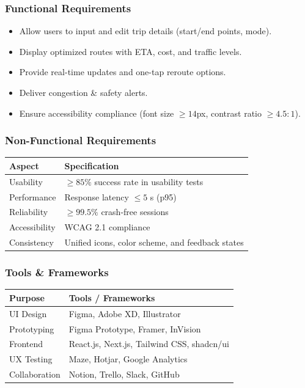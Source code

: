 \subsubsection{Functional Requirements}
\begin{itemize}
  \item Allow users to input and edit trip details (start/end points, mode).
  \item Display optimized routes with ETA, cost, and traffic levels.
  \item Provide real-time updates and one-tap reroute options.
  \item Deliver congestion \& safety alerts.
  \item Ensure accessibility compliance (font size $\ge 14$px, contrast ratio $\ge 4.5:1$).
\end{itemize}

\subsubsection{Non-Functional Requirements}
\renewcommand{\arraystretch}{1.12}
\begin{tabularx}{\textwidth}{|>{\raggedright\arraybackslash}p{2.9cm}|>{\raggedright\arraybackslash}X|}
\hline
	\textbf{Aspect} & \textbf{Specification} \\
\hline
Usability & $\ge 85\%$ success rate in usability tests \\
\hline
Performance & Response latency $\le 5$ s (p95) \\
\hline
Reliability & $\ge 99.5\%$ crash-free sessions \\
\hline
Accessibility & WCAG 2.1 compliance \\
\hline
Consistency & Unified icons, color scheme, and feedback states \\
\hline
\end{tabularx}

\subsubsection{Tools \& Frameworks}
\renewcommand{\arraystretch}{1.12}
\begin{tabularx}{\textwidth}{|>{\raggedright\arraybackslash}p{3.0cm}|>{\raggedright\arraybackslash}X|}
\hline
	\textbf{Purpose} & \textbf{Tools / Frameworks} \\
\hline
UI Design & Figma, Adobe XD, Illustrator \\
\hline
Prototyping & Figma Prototype, Framer, InVision \\
\hline
Frontend & React.js, Next.js, Tailwind CSS, shadcn/ui \\
\hline
UX Testing & Maze, Hotjar, Google Analytics \\
\hline
Collaboration & Notion, Trello, Slack, GitHub \\
\hline
\end{tabularx}

